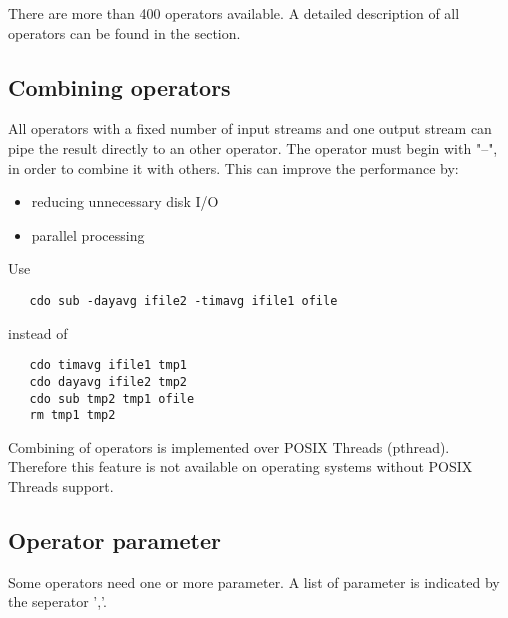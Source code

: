 There are more than 400 operators available.
A detailed description of all operators can be found in the
{\bf {}} section.


\subsection{Combining operators}

All operators with a fixed number of input streams and one output stream
can pipe the result directly to an other operator.
The operator must begin with "--", in order to combine it with others.
This can improve the performance by:
\begin{itemize}
\item reducing unnecessary disk I/O
\item parallel processing
\end{itemize}
Use
\begin{verbatim}
   cdo sub -dayavg ifile2 -timavg ifile1 ofile
\end{verbatim}
instead of
\begin{verbatim}
   cdo timavg ifile1 tmp1
   cdo dayavg ifile2 tmp2
   cdo sub tmp2 tmp1 ofile
   rm tmp1 tmp2
\end{verbatim}


Combining of operators is implemented over POSIX Threads (pthread).
Therefore this {\CDO} feature is not available on operating systems 
without POSIX Threads support.

\subsection{Operator parameter}

Some operators need one or more parameter.
A list of parameter is indicated by the seperator ','.

